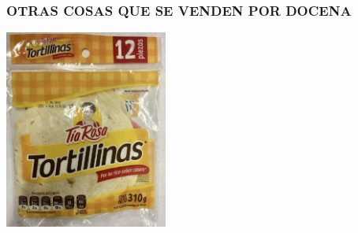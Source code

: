 \begin{frame}
  \frametitle{OTRAS COSAS QUE SE VENDEN POR DOCENA}

  \begin{center}
    \includegraphics[width=0.4\textwidth]{tia-rosa.jpg}
  \end{center}
\end{frame}

